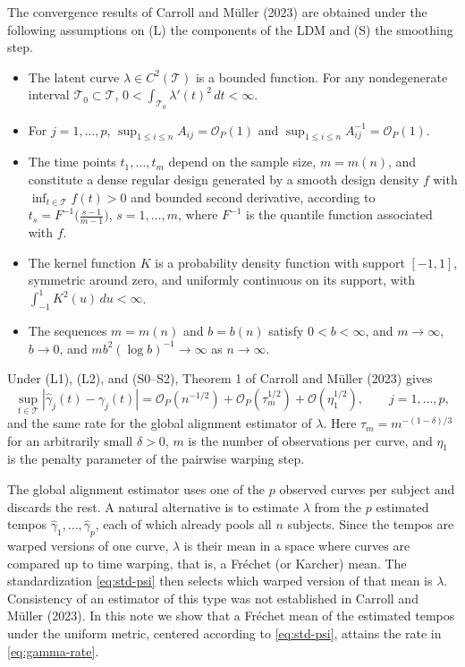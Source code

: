\documentclass[11pt]{article}
\newcommand{\T}{\mathcal{T}}
\newcommand{\ghat}{\hat{\gamma}}
\newcommand{\Op}{\mathcal{O}_P}
\newcommand{\sups}{\sup_{t \in \T}}
\begin{document}
The convergence results of Carroll and M\"{u}ller (2023) are obtained under the following
assumptions on (L) the components of the LDM and (S) the smoothing step.
\begin{itemize}
  \item[(L1)] The latent curve $\lambda \in C^2(\T)$ is a bounded function. For any
    nondegenerate interval $\T_0 \subset \T$, $0 < \int_{\T_0}\lambda'(t)^2\,dt < \infty$.
  \item[(L2)] For $j = 1,\ldots,p$, $\sup_{1\le i\le n} A_{ij} = \Op(1)$ and
    $\sup_{1\le i\le n} A_{ij}^{-1} = \Op(1)$.
  \item[(S0)] The time points $t_1,\ldots,t_m$ depend on the sample size, $m = m(n)$, and
    constitute a dense regular design generated by a smooth design density $f$ with
    $\inf_{t\in\T} f(t) > 0$ and bounded second derivative, according to
    $t_s = F^{-1}\bigl(\tfrac{s-1}{m-1}\bigr)$, $s = 1,\ldots,m$, where $F^{-1}$ is the
    quantile function associated with $f$.
  \item[(S1)] The kernel function $K$ is a probability density function with support
    $[-1,1]$, symmetric around zero, and uniformly continuous on its support, with
    $\int_{-1}^{1}K^2(u)\,du < \infty$.
  \item[(S2)] The sequences $m = m(n)$ and $b = b(n)$ satisfy $0 < b < \infty$, and
    $m \to \infty$, $b \to 0$, and $mb^2(\log b)^{-1} \to \infty$ as $n \to \infty$.
\end{itemize}
Under (L1), (L2), and (S0--S2), Theorem 1 of Carroll and M\"{u}ller (2023) gives
\begin{equation}
  \sups |\ghat_j(t) - \gamma_j(t)|
  = \Op(n^{-1/2}) + \Op(\tau_m^{1/2}) + \mathcal{O}(\eta_1^{1/2}),
  \qquad j = 1,\ldots,p,
  \label{eq:gamma-rate}
\end{equation}
and the same rate for the global alignment estimator of $\lambda$. Here
$\tau_m = m^{-(1-\delta)/3}$ for an arbitrarily small $\delta > 0$, $m$ is the number of
observations per curve, and $\eta_1$ is the penalty parameter of the pairwise warping step.

The global alignment estimator uses one of the $p$ observed curves per subject and discards
the rest. A natural alternative is to estimate $\lambda$ from the $p$ estimated tempos
$\ghat_1,\ldots,\ghat_p$, each of which already pools all $n$ subjects. Since the tempos
are warped versions of one curve, $\lambda$ is their mean in a space where curves are compared
up to time warping, that is, a Fr\'echet (or Karcher) mean. The standardization
\eqref{eq:std-psi} then selects which warped version of that mean is $\lambda$. Consistency of
an estimator of this type was not established in Carroll and M\"{u}ller (2023). In this note
we show that a Fr\'echet mean of the estimated tempos under the uniform metric, centered
according to \eqref{eq:std-psi}, attains the rate in \eqref{eq:gamma-rate}.
\end{document}
